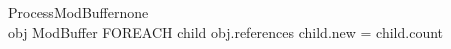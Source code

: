 \documentclass{beamer}
\begin{document}
\begin{frame}
\begin{pseudocode}{ProcessModBuffer}{none}
	\\
	\FOREACH obj \in ModBuffer \DO
	\BEGIN
		FOREACH child \in obj.references \DO
		\BEGIN
			\IF child.new = \TRUE \THEN 
			\BEGIN
				child.count 
			\END
		\END
	\END
\end{pseudocode}
\end{frame}
	
\end{document}
